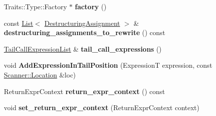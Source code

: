 \begin{DoxyCompactItemize}
\item 
Traits\+::\+Type\+::\+Factory $\ast$ {\bfseries factory} ()\hypertarget{classv8_1_1internal_1_1_parser_base_1_1_b_a_s_e___e_m_b_e_d_d_e_d_a53daa944fc570bb12e50b64bd7051cf0}{}\label{classv8_1_1internal_1_1_parser_base_1_1_b_a_s_e___e_m_b_e_d_d_e_d_a53daa944fc570bb12e50b64bd7051cf0}

\item 
const \hyperlink{classv8_1_1internal_1_1_list}{List}$<$ \hyperlink{structv8_1_1internal_1_1_parser_base_1_1_destructuring_assignment}{Destructuring\+Assignment} $>$ \& {\bfseries destructuring\+\_\+assignments\+\_\+to\+\_\+rewrite} () const \hypertarget{classv8_1_1internal_1_1_parser_base_1_1_b_a_s_e___e_m_b_e_d_d_e_d_a118572c9ea81497d582de558700779ea}{}\label{classv8_1_1internal_1_1_parser_base_1_1_b_a_s_e___e_m_b_e_d_d_e_d_a118572c9ea81497d582de558700779ea}

\item 
\hyperlink{classv8_1_1internal_1_1_parser_base_1_1_tail_call_expression_list}{Tail\+Call\+Expression\+List} \& {\bfseries tail\+\_\+call\+\_\+expressions} ()\hypertarget{classv8_1_1internal_1_1_parser_base_1_1_b_a_s_e___e_m_b_e_d_d_e_d_ad7032b59fa39e4e01b1ec777116be70b}{}\label{classv8_1_1internal_1_1_parser_base_1_1_b_a_s_e___e_m_b_e_d_d_e_d_ad7032b59fa39e4e01b1ec777116be70b}

\item 
void {\bfseries Add\+Expression\+In\+Tail\+Position} (ExpressionT expression, const \hyperlink{structv8_1_1internal_1_1_scanner_1_1_location}{Scanner\+::\+Location} \&loc)\hypertarget{classv8_1_1internal_1_1_parser_base_1_1_b_a_s_e___e_m_b_e_d_d_e_d_a018bd68cc691592af2718fcaa80f2ffc}{}\label{classv8_1_1internal_1_1_parser_base_1_1_b_a_s_e___e_m_b_e_d_d_e_d_a018bd68cc691592af2718fcaa80f2ffc}

\item 
Return\+Expr\+Context {\bfseries return\+\_\+expr\+\_\+context} () const \hypertarget{classv8_1_1internal_1_1_parser_base_1_1_b_a_s_e___e_m_b_e_d_d_e_d_ac7ae2ae751d75e9d579ebb13557e76a6}{}\label{classv8_1_1internal_1_1_parser_base_1_1_b_a_s_e___e_m_b_e_d_d_e_d_ac7ae2ae751d75e9d579ebb13557e76a6}

\item 
void {\bfseries set\+\_\+return\+\_\+expr\+\_\+context} (Return\+Expr\+Context context)\hypertarget{classv8_1_1internal_1_1_parser_base_1_1_b_a_s_e___e_m_b_e_d_d_e_d_a60f3f2cfe86c9c46c67eb6f8655e2eab}{}\label{classv8_1_1internal_1_1_parser_base_1_1_b_a_s_e___e_m_b_e_d_d_e_d_a60f3f2cfe86c9c46c67eb6f8655e2eab}


\end{DoxyCompactItemize}
